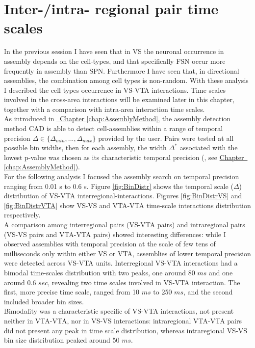 \section{Inter-/intra- regional pair time scales}
\label{sec:TimeScales}
In the previous session I have seen that in VS the neuronal occurrence in assembly depends on the cell-types, and that specifically FSN occur more frequently in assembly than SPN. Furthermore I have seen that, in directional assemblies, the combination among cell types is non-random. With these analysis I described the cell types occurrence in VS-VTA interactions. Time scales involved in the cross-area interactions will be examined later in this chapter, together with a comparison with intra-area interaction time scales.\\As introduced in \hyperref[chap:AssemblyMethod]{~Chapter \ref*{chap:AssemblyMethod}}, the assembly detection method CAD is able to detect cell-assemblies within a range of temporal precision $\Delta\in\{\Delta_{min},...,\Delta_{max}\}$ provided by the user. Pairs were tested at all possible bin widths, then for each assembly, the width $\Delta^*$ associated with the lowest p-value was chosen as its characteristic temporal precision (\cite{RussoDurstewitz}, see \hyperref[chap:AssemblyMethod]{Chapter~ \ref*{chap:AssemblyMethod}}).\\For the following analysis I focused the assembly search on temporal precision ranging from 0.01 s to 0.6 s. Figure \ref{fig:BinDistr} shows the temporal scale ($\Delta$) distribution of VS-VTA interregional-interactions. Figures \ref{fig:BinDistrVS} and \ref{fig:BinDistrVTA} show VS-VS and VTA-VTA time-scale interactions distribution respectively.\\A comparison among interregional pairs (VS-VTA pairs) and intraregional pairs (VS-VS pairs and VTA-VTA pairs) showed interesting differences: while I observed assemblies with temporal precision at the scale of few tens of milliseconds only within either VS or VTA, assemblies of lower temporal precision were detected across VS-VTA units. Interregional VS-VTA interactions had a bimodal time-scales distribution with two peaks, one around 80 $ms$ and one around 0.6 $sec$, revealing two time scales involved in VS-VTA interaction. The first, more precise time scale, ranged from 10 $ms$ to 250 $ms$, and the second included broader bin sizes.\\Bimodality was a characteristic specific of VS-VTA interactions, not present neither in VTA-VTA, nor in VS-VS interactions: intraregional VTA-VTA pairs did not present any peak in time scale distribution, whereas intraregional VS-VS bin size distribution peaked around 50 $ms$.  
